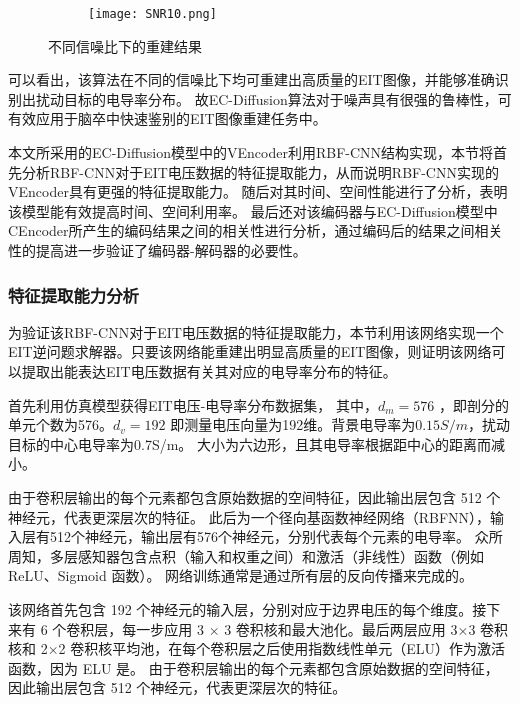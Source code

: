 \newcommand{\subfiggggg}{
\begin{subfigure}[b]{0.8\linewidth}
\centering
\texttt{[image: SNR10.png]}
\subcaption{信噪比为10时的重建结果}
\end{subfigure}
\label{subfigure:SNR30}
}

\begin{figure}[H]
    \subfigg
    \subfiggg
    \subfigggg
    \subfiggggg
    \caption{不同信噪比下的重建结果}
    \label{fig:SNR}
\end{figure}

可以看出，该算法在不同的信噪比下均可重建出高质量的EIT图像，并能够准确识别出扰动目标的电导率分布。
故EC-Diffusion算法对于噪声具有很强的鲁棒性，可有效应用于脑卒中快速鉴别的EIT图像重建任务中。


本文所采用的EC-Diffusion模型中的VEncoder利用RBF-CNN结构实现，本节将首先分析RBF-CNN对于EIT电压数据的特征提取能力，从而说明RBF-CNN实现的VEncoder具有更强的特征提取能力。
随后对其时间、空间性能进行了分析，表明该模型能有效提高时间、空间利用率。
最后还对该编码器与EC-Diffusion模型中CEncoder所产生的编码结果之间的相关性进行分析，通过编码后的结果之间相关性的提高进一步验证了编码器-解码器的必要性。

\subsubsection{特征提取能力分析}

为验证该RBF-CNN对于EIT电压数据的特征提取能力，本节利用该网络实现一个EIT逆问题求解器。只要该网络能重建出明显高质量的EIT图像，则证明该网络可以提取出能表达EIT电压数据有关其对应的电导率分布的特征。

首先利用仿真模型获得EIT电压-电导率分布数据集，
其中，$d_m =  576$ ，即剖分的单元个数为576。$d_v = 192$ 即测量电压向量为192维。背景电导率为$0.15S/m$，扰动目标的中心电导率为0.7S/m。
大小为六边形，且其电导率根据距中心的距离而减小。


由于卷积层输出的每个元素都包含原始数据的空间特征，因此输出层包含 512 个神经元，代表更深层次的特征。
此后为一个径向基函数神经网络（RBFNN），输入层有512个神经元，输出层有576个神经元，分别代表每个元素的电导率。
众所周知，多层感知器包含点积（输入和权重之间）和激活（非线性）函数（例如 ReLU、Sigmoid 函数）。
网络训练通常是通过所有层的反向传播来完成的。

该网络首先包含 192 个神经元的输入层，分别对应于边界电压的每个维度。接下来有 6 个卷积层，每一步应用 3 × 3 卷积核和最大池化。最后两层应用 3×3 卷积核和 2×2 卷积核平均池，在每个卷积层之后使用指数线性单元（ELU）作为激活函数，因为 ELU 是。
由于卷积层输出的每个元素都包含原始数据的空间特征，因此输出层包含 512 个神经元，代表更深层次的特征。

